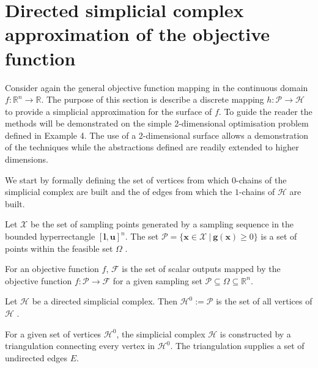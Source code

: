 \section{Directed simplicial complex approximation of the objective function}
Consider again the general objective function mapping in the continuous domain $f : \mathbb{R}^n \rightarrow \mathbb{R}$. The purpose of this section is describe a discrete mapping $h: \mathcal{P}\rightarrow \mathcal{H}$ to provide a simplicial approximation for the surface of $f$. To guide the reader the methods will be demonstrated on the simple 2-dimensional optimisation problem defined in Example 4. The use of a 2-dimensional surface allows a demonstration of the techniques while the abstractions defined are readily extended to higher dimensions. 

We start by formally defining the set of vertices from which $0$-chains of the simplicial complex are built and the of edges from which the $1$-chains of $\mathcal{H}$ are built.

\begin{definition} \label{def:h0}
Let  $\mathcal{X}$ be the set of sampling points generated by a sampling sequence in the bounded hyperrectangle $[\mathbf{l}, \mathbf{u}]^n$. The set $\mathcal{P} = \{\mathbf{x} \in \mathcal{X}~|~\mathbf{g}(\mathbf{x}) \geq 0 \}$ is a set of points within the feasible set $\Omega$ .
\end{definition}

\begin{definition} \label{def:h0.5}
For an objective function $f$, $\mathcal{F}$ is the set of scalar outputs mapped by the objective function $f:\mathcal{P} \rightarrow \mathcal{F}$ for a given sampling set $\mathcal{P} \subseteq \Omega \subseteq \mathbb{R}^n$.
\end{definition}

\begin{definition} \label{def:h1}
Let $\mathcal{H}$ be a directed simplicial complex. Then $\mathcal{H}^0 := \mathcal{P}$ is the set of all vertices of $\mathcal{H}$ .
\end{definition}

\begin{definition} \label{def:h2}
For a given set of vertices $\mathcal{H}^0$, the simplicial complex $\mathcal{H}$ is constructed by a triangulation connecting every vertex in $\mathcal{H}^0$. The triangulation supplies a set of undirected edges $E$.
\end{definition}

